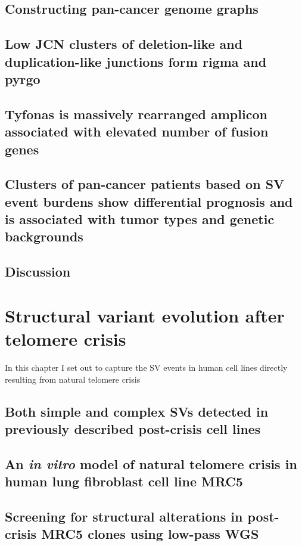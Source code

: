 \documentclass[phd,tocprelim]{cornell}
\begin{document}
\section{Constructing pan-cancer genome graphs}

\section{Low JCN clusters of deletion-like and duplication-like junctions form rigma and pyrgo}

\section{Tyfonas is massively rearranged amplicon associated with elevated number of fusion genes}

\section{Clusters of pan-cancer patients based on SV event burdens show differential prognosis and is associated with tumor types and genetic backgrounds}

\section{Discussion}


\chapter{Structural variant evolution after telomere crisis}
In this chapter I set out to capture the SV events in human cell lines directly resulting from natural telomere crisis

\section{Both simple and complex SVs detected in previously described post-crisis cell lines}

\section{An \textit{in vitro} model of natural telomere crisis in human lung fibroblast cell line MRC5}

\section{Screening for structural alterations in post-crisis MRC5 clones using low-pass WGS}
\end{document}
